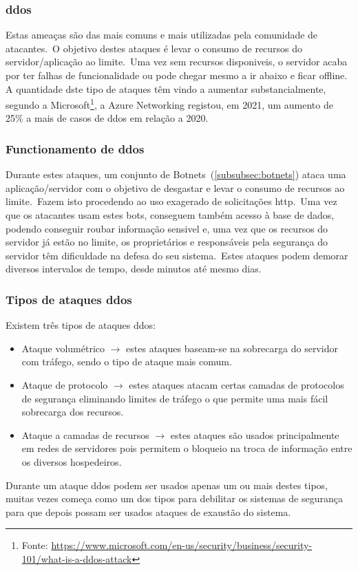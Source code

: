 \documentclass{report}
\begin{document}
\subsubsection{\large \ac{ddos}}
\label{subsubsec:ddos}
Estas ameaças são das mais comuns e mais utilizadas pela comunidade de atacantes.\ O objetivo destes ataques é levar o consumo de recursos do servidor/aplicação ao limite.\ Uma vez sem recursos disponiveis, o servidor acaba por ter falhas de funcionalidade ou pode chegar mesmo a ir abaixo e ficar offline.\\
A quantidade dste tipo de ataques têm vindo a aumentar substancialmente, segundo a Microsoft\footnote{Fonte: \url{https://www.microsoft.com/en-us/security/business/security-101/what-is-a-ddos-attack}}, a Azure Networking registou, em 2021, um aumento de 25\% a mais de casos de \ac{ddos} em relação a 2020.

\subsubsection{Functionamento de \ac{ddos}}
Durante estes ataques, um conjunto de Botnets~(\ref{subsubsec:botnets}) ataca uma aplicação/servidor com o objetivo de desgastar e levar o consumo de recursos ao limite.\ Fazem isto procedendo ao uso exagerado de solicitações \ac{http}.\ Uma vez que os atacantes usam estes bots, conseguem também acesso à base de dados, podendo conseguir roubar informação sensivel e, uma vez que os recursos do servidor já estão no limite, os proprietários e responsáveis pela segurança do servidor têm dificuldade na defesa do seu sistema.\ Estes ataques podem demorar diversos intervalos de tempo, desde minutos até mesmo dias.

\subsubsection{Tipos de ataques \ac{ddos}}
Existem três tipos de ataques \ac{ddos}:
\begin{itemize}
    \item Ataque volumétrico $\rightarrow$ estes ataques baseam-se na sobrecarga do servidor com tráfego, sendo o tipo de ataque mais comum.
    \item Ataque de protocolo $\rightarrow$ estes ataques atacam certas camadas de protocolos de segurança eliminando limites de tráfego o que permite uma mais fácil sobrecarga dos recursos.
    \item Ataque a camadas de recursos $\rightarrow$ estes ataques são usados principalmente em redes de servidores pois permitem o bloqueio na troca de informação entre os diversos hospedeiros.
\end{itemize}
Durante um ataque \ac{ddos} podem ser usados apenas um ou mais destes tipos, muitas vezes começa como um dos tipos para debilitar os sistemas de segurança para que depois possam ser usados ataques de exaustão do sistema.
\end{document}
